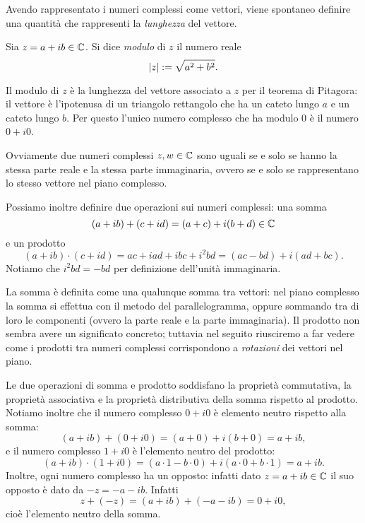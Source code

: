 Avendo rappresentato i numeri complessi come vettori, viene spontaneo definire una quantità che rappresenti la \emph{lunghezza} del vettore.
\begin{definition}
     Sia $z = a + ib \in \C$. Si dice \emph{modulo} di $z$ il numero reale \begin{equation}
        \abs*{z} \deq \sqrt{a^2 + b^2}. 
    \end{equation}
\end{definition}

Il modulo di $z$ è la lunghezza del vettore associato a $z$ per il teorema di Pitagora: il vettore è l'ipotenusa di un triangolo rettangolo che ha un cateto lungo $a$ e un cateto lungo $b$. Per questo l'unico numero complesso che ha modulo $0$ è il numero $0 +i0$.

Ovviamente due numeri complessi $z, w \in \C$ sono uguali se e solo se hanno la stessa parte reale e la stessa parte immaginaria, ovvero se e solo se rappresentano lo stesso vettore nel piano complesso.

Possiamo inoltre definire due operazioni sui numeri complessi: una somma \begin{equation}
    (a + ib) + (c + id) = (a + c) + i(b + d) \in \C
\end{equation} e un prodotto \begin{equation}
    (a + ib) \cdot (c + id) = ac + iad + ibc + i^2bd = (ac - bd) + i(ad + bc).
\end{equation} Notiamo che $i^2bd = -bd$ per definizione dell'unità immaginaria.

La somma è definita come una qualunque somma tra vettori: nel piano complesso la somma si effettua con il metodo del parallelogramma, oppure sommando tra di loro le componenti (ovvero la parte reale e la parte immaginaria). Il prodotto non sembra avere un significato concreto; tuttavia nel seguito riusciremo a far vedere come i prodotti tra numeri complessi corrispondono a \emph{rotazioni} dei vettori nel piano.

Le due operazioni di somma e prodotto soddisfano la proprietà commutativa, la proprietà associativa e la proprietà distributiva della somma rispetto al prodotto. Notiamo inoltre che il numero complesso $0 + i0$ è elemento neutro rispetto alla somma: \[
    (a + ib) + (0 + i0) = (a + 0) + i(b + 0) = a + ib,    
\] e il numero complesso $1 + i0$ è l'elemento neutro del prodotto: \[
    (a + ib) \cdot (1 + i0) = (a\cdot 1 - b\cdot 0) + i(a\cdot 0 + b\cdot 1) = a + ib.    
\] Inoltre, ogni numero complesso ha un opposto: infatti dato $z = a+ib \in \C$ il suo opposto è dato da $-z = -a-ib$. Infatti \[
    z + (-z) = (a+ib) + (-a-ib) = 0 + i0,
\] cioè l'elemento neutro della somma.

